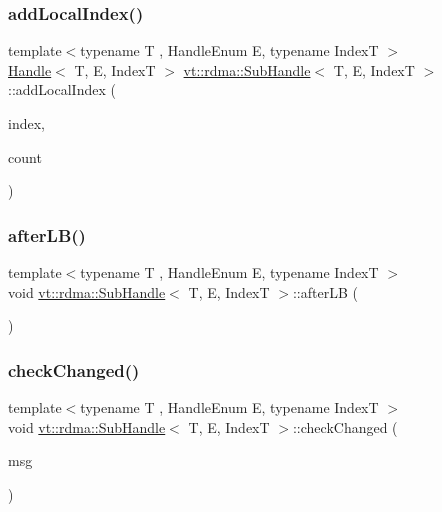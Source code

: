 \subsubsection{\texorpdfstring{add\+Local\+Index()}{addLocalIndex()}}
{\footnotesize\ttfamily template$<$typename T , Handle\+Enum E, typename IndexT $>$ \\
\hyperlink{structvt_1_1rdma_1_1_handle}{Handle}$<$ T, E, IndexT $>$ \hyperlink{structvt_1_1rdma_1_1_sub_handle}{vt\+::rdma\+::\+Sub\+Handle}$<$ T, E, IndexT $>$\+::add\+Local\+Index (\begin{DoxyParamCaption}\item[{IndexT}]{index,  }\item[{uint64\+\_\+t}]{count }\end{DoxyParamCaption})}

\mbox{\label{structvt_1_1rdma_1_1_sub_handle_a9d441d9e8080998111cc659b8ce725b1}} 
\subsubsection{\texorpdfstring{after\+L\+B()}{afterLB()}}
{\footnotesize\ttfamily template$<$typename T , Handle\+Enum E, typename IndexT $>$ \\
void \hyperlink{structvt_1_1rdma_1_1_sub_handle}{vt\+::rdma\+::\+Sub\+Handle}$<$ T, E, IndexT $>$\+::after\+LB (\begin{DoxyParamCaption}{ }\end{DoxyParamCaption})}

\mbox{\label{structvt_1_1rdma_1_1_sub_handle_af872a0071eac521cb813d998763f5a31}} 
\subsubsection{\texorpdfstring{check\+Changed()}{checkChanged()}}
{\footnotesize\ttfamily template$<$typename T , Handle\+Enum E, typename IndexT $>$ \\
void \hyperlink{structvt_1_1rdma_1_1_sub_handle}{vt\+::rdma\+::\+Sub\+Handle}$<$ T, E, IndexT $>$\+::check\+Changed (\begin{DoxyParamCaption}\item[{\hyperlink{structvt_1_1rdma_1_1impl_1_1_reduce_l_b_msg}{impl\+::\+Reduce\+L\+B\+Msg} $\ast$}]{msg }\end{DoxyParamCaption})}

